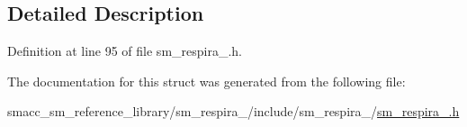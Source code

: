 \subsection{Detailed Description}


Definition at line 95 of file sm\+\_\+respira\+\_.\+h.



The documentation for this struct was generated from the following file\+:\begin{DoxyCompactItemize}
\item 
smacc\+\_\+sm\+\_\+reference\+\_\+library/sm\+\_\+respira\+\_/include/sm\+\_\+respira\+\_/\hyperlink{sm__respira__1_8h}{sm\+\_\+respira\+\_.\+h}\end{DoxyCompactItemize}
